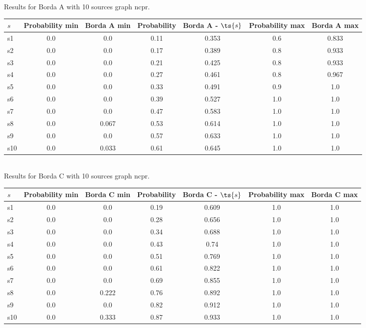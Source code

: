 \documentclass{article}
\begin{document}
\noindent Results for Borda A with 10 sources graph ncpr.

\noindent\begin{tabular}{|l|c|c|c|c|c|c|}
\hline
$s$& Probability min & Borda A min & Probability & Borda A - $\ts{s}$ & Probability max & Borda A max\\
\hline
s1 &0.0 & 0.0 & 0.11 & 0.353 & 0.6 & 0.833\\
\hline
s2 &0.0 & 0.0 & 0.17 & 0.389 & 0.8 & 0.933\\
\hline
s3 &0.0 & 0.0 & 0.21 & 0.425 & 0.8 & 0.933\\
\hline
s4 &0.0 & 0.0 & 0.27 & 0.461 & 0.8 & 0.967\\
\hline
s5 &0.0 & 0.0 & 0.33 & 0.491 & 0.9 & 1.0\\
\hline
s6 &0.0 & 0.0 & 0.39 & 0.527 & 1.0 & 1.0\\
\hline
s7 &0.0 & 0.0 & 0.47 & 0.583 & 1.0 & 1.0\\
\hline
s8 &0.0 & 0.067 & 0.53 & 0.614 & 1.0 & 1.0\\
\hline
s9 &0.0 & 0.0 & 0.57 & 0.633 & 1.0 & 1.0\\
\hline
s10 &0.0 & 0.033 & 0.61 & 0.645 & 1.0 & 1.0\\
\hline
\end{tabular}\\

\noindent Results for Borda C with 10 sources graph ncpr.

\noindent\begin{tabular}{|l|c|c|c|c|c|c|}
\hline
$s$& Probability min & Borda C min & Probability & Borda C - $\ts{s}$ & Probability max & Borda C max\\
\hline
s1 &0.0 & 0.0 & 0.19 & 0.609 & 1.0 & 1.0\\
\hline
s2 &0.0 & 0.0 & 0.28 & 0.656 & 1.0 & 1.0\\
\hline
s3 &0.0 & 0.0 & 0.34 & 0.688 & 1.0 & 1.0\\
\hline
s4 &0.0 & 0.0 & 0.43 & 0.74 & 1.0 & 1.0\\
\hline
s5 &0.0 & 0.0 & 0.51 & 0.769 & 1.0 & 1.0\\
\hline
s6 &0.0 & 0.0 & 0.61 & 0.822 & 1.0 & 1.0\\
\hline
s7 &0.0 & 0.0 & 0.69 & 0.855 & 1.0 & 1.0\\
\hline
s8 &0.0 & 0.222 & 0.76 & 0.892 & 1.0 & 1.0\\
\hline
s9 &0.0 & 0.0 & 0.82 & 0.912 & 1.0 & 1.0\\
\hline
s10 &0.0 & 0.333 & 0.87 & 0.933 & 1.0 & 1.0\\
\hline
\end{tabular}\\
\end{document}

